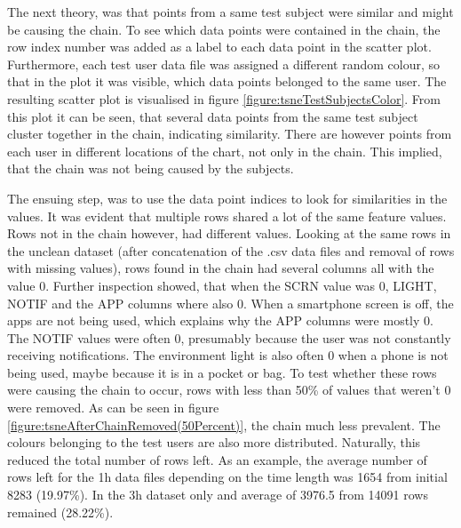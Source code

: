 The next theory, was that points from a same test subject were similar and might be causing the chain. To see which data points were contained in the chain, the row index number was added as a label to each data point in the scatter plot. Furthermore, each test user data file was assigned a different random colour, so that in the plot it was visible, which data points belonged to the same user. The resulting scatter plot is visualised in figure \ref{figure:tsneTestSubjectsColor}. From this plot it can be seen, that several data points from the same test subject cluster together in the chain, indicating similarity. There are however points from each user in different locations of the chart, not only in the chain. This implied, that the chain was not being caused by the subjects. 

The ensuing step, was to use the data point indices to look for similarities in the values. It was evident that multiple rows shared a lot of the same feature values. Rows not in the chain however, had different values. Looking at the same rows in the unclean dataset (after concatenation of the .csv data files and removal of rows with missing values), rows found in the chain had several columns all with the value 0. Further inspection showed, that when the SCRN value was 0, LIGHT, NOTIF and the APP columns where also 0. When a smartphone screen is off, the apps are not being used, which explains why the APP columns were mostly 0. The NOTIF values were often 0, presumably because the user was not constantly receiving notifications. The environment light is also often 0 when a phone is not being used, maybe because it is in a pocket or bag. To test whether these rows were causing the chain to occur, rows with less than 50\% of values that weren't 0 were removed. As can be seen in figure \ref{figure:tsneAfterChainRemoved(50Percent)}, the chain much less prevalent. The colours belonging to the test users are also more distributed. Naturally, this reduced the total number of rows left. As an example, the average number of rows left for the 1h data files depending on the time length was 1654 from initial 8283 (19.97\%). In the 3h dataset only and average of 3976.5 from 14091 rows remained (28.22\%).





